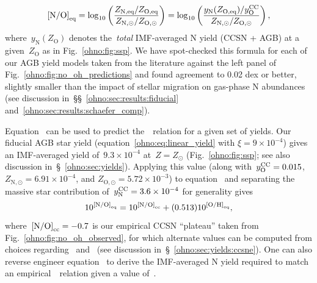 \begin{equation}
\text{[N/O]}_\text{eq} = \log_{10}\left(\frac{
	Z_\text{N,eq} / Z_\text{O,eq}
}{
	Z_{\text{N},\odot} / {Z_{\text{O},\odot}}
}\right) = \log_{10}\left(\frac{
	y_\text{N}(Z_\text{O,eq}) / y_\text{O}^\text{CC}
}{
	Z_{\text{N},\odot} / Z_{\text{O},\odot}
}\right),
\label{ohno:eq:noeq}
\end{equation}
where~$y_\text{N}(Z_\text{O})$ denotes the~\textit{total} IMF-averaged N yield
(CCSN + AGB) at a given~$Z_\text{O}$ as in Fig.~\ref{ohno:fig:ssp}.
We have spot-checked this formula for each of our AGB yield models taken from
the literature against the left panel of Fig.~\ref{ohno:fig:no_oh_predictions} and
found agreement to 0.02 dex or better, slightly smaller than the impact of
stellar migration on gas-phase N abundances (see discussion
in~\S\S~\ref{ohno:sec:results:fiducial} and~\ref{ohno:sec:results:schaefer_comp}).
\par
Equation~ can be used to predict the~\ohno~relation for a given
set of yields.
Our fiducial AGB star yield (equation~\ref{ohno:eq:linear_yield} with
$\xi = 9\times10^{-4}$) gives an IMF-averaged yield of~$9.3\times10^{-4}$ 
at~$Z = Z_\odot$ (Fig.~\ref{ohno:fig:ssp}; see also discussion
in~\S~\ref{ohno:sec:yields}).
Applying this value (along with~$y_\text{O}^\text{CC} = 0.015$,
$Z_{\text{N},\odot} = 6.91\times10^{-4}$, and
$Z_{\text{O},\odot} = 5.72\times10^{-3}$) to equation~ and
separating the massive star contribution of~$y_\text{N}^\text{CC} = 3.6\times10^{-4}$ for
generality gives
\begin{equation}
10^{\text{[N/O]}_\text{eq}} = 10^{\text{[N/O]}_\text{cc}} + (0.513)10^{\text{[O/H]}_\text{eq}},
\end{equation}
where~$\text{[N/O]}_\text{cc} = -0.7$ is our empirical CCSN ``plateau'' taken from
Fig.~\ref{ohno:fig:no_oh_observed}, for which alternate values can be computed from
choices regarding~ and~ (see discussion
in~\S~\ref{ohno:sec:yields:ccsne}).
One can also reverse engineer equation~ to derive the IMF-averaged
N yield required to match an empirical~\ohno~relation given a value of~.

